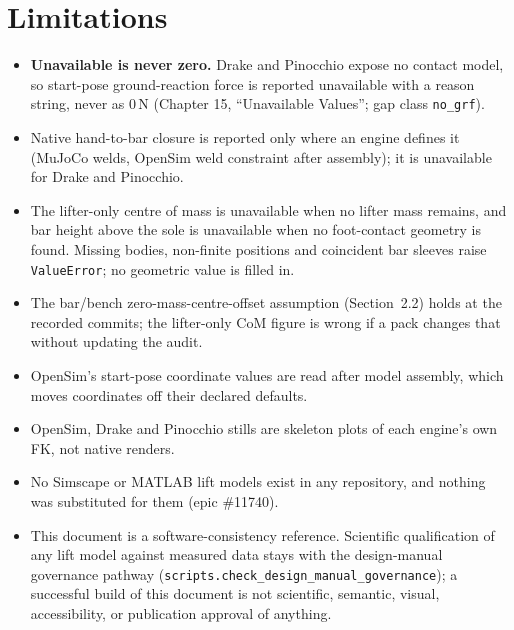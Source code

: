 \documentclass[11pt,a4paper]{article}
\begin{document}
\section{Limitations}
\begin{itemize}[nosep]
\item \textbf{Unavailable is never zero.} Drake and Pinocchio expose no
  contact model, so start-pose ground-reaction force is reported
  unavailable with a reason string, never as 0\,N (Chapter 15, ``Unavailable
  Values''; gap class \texttt{no\_grf}).
\item Native hand-to-bar closure is reported only where an engine defines it
  (MuJoCo welds, OpenSim weld constraint after assembly); it is unavailable
  for Drake and Pinocchio.
\item The lifter-only centre of mass is unavailable when no lifter mass
  remains, and bar height above the sole is unavailable when no foot-contact
  geometry is found. Missing bodies, non-finite positions and coincident bar
  sleeves raise \texttt{ValueError}; no geometric value is filled in.
\item The bar/bench zero-mass-centre-offset assumption (Section~2.2) holds at
  the recorded commits; the lifter-only CoM figure is wrong if a pack changes
  that without updating the audit.
\item OpenSim's start-pose coordinate values are read after model assembly,
  which moves coordinates off their declared defaults.
\item OpenSim, Drake and Pinocchio stills are skeleton plots of each engine's
  own FK, not native renders.
\item No Simscape or MATLAB lift models exist in any repository, and nothing
  was substituted for them (epic \#11740).
\item This document is a software-consistency reference. Scientific
  qualification of any lift model against measured data stays with the
  design-manual governance pathway (\texttt{scripts.check\_design\_manual\_governance});
  a successful build of this document is not scientific, semantic, visual,
  accessibility, or publication approval of anything.
\end{itemize}
\end{document}
